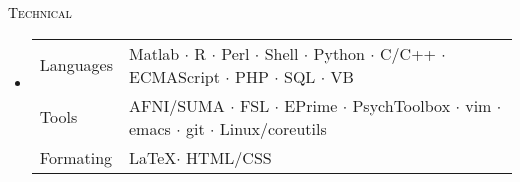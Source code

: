 \begin{minipage}{\firstWidth}
\large \textcolor{Black}{\textsc{Technical}}
\end{minipage}
\begin{minipage}{\secondWidth}
\begin{itemize}
    \item 
    \begin{tabular}{ll}
    Languages &  Matlab $\cdot$ R $\cdot$ Perl $\cdot$ Shell $\cdot$ Python $\cdot$ C/C++ $\cdot$ ECMAScript $\cdot$ PHP $\cdot$ SQL $\cdot$ VB \\
    Tools&  AFNI/SUMA $\cdot$ FSL $\cdot$ EPrime $\cdot$ PsychToolbox $\cdot$ vim $\cdot$ emacs $\cdot$ git $\cdot$ Linux/coreutils \\
    Formating & \LaTeX  $\cdot$ HTML/CSS \\
    \end{tabular}
\end{itemize}
\end{minipage}
